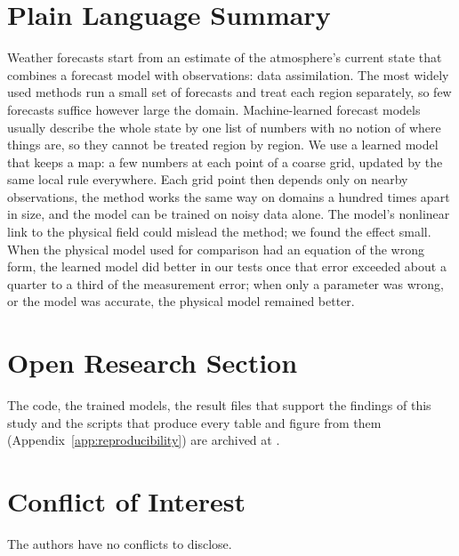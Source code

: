 \documentclass[draft]{PJ2019}
\begin{document}
\section*{Plain Language Summary}
Weather forecasts start from an estimate of the atmosphere's current state that combines a
forecast model with observations: data assimilation. The most widely used methods run
a small set of forecasts and treat each region separately, so few forecasts suffice however
large the domain. Machine-learned forecast models usually describe the
whole state by one list of numbers with no notion of where things are, so they cannot be
treated region by region. We use a learned model that keeps a map: a few numbers
at each point of a coarse grid, updated by the same local rule everywhere. Each grid point then
depends only on nearby observations, the method works the same way on domains a hundred times
apart in size, and the model can be trained on noisy data alone. The model's nonlinear
link to the physical field could mislead the method; we found the effect small. When the
physical model used for comparison had an equation of the wrong form, the learned model did better
in our tests once that error exceeded about a quarter to a third of the measurement error; when only
a parameter was wrong, or the model was accurate, the physical model remained better.














\appendix






\section*{Open Research Section}
The code, the trained models, the result files that support the findings of this study and the
scripts that produce every table and figure from them (Appendix~\ref{app:reproducibility}) are
archived at .

\acknowledgments

\section*{Conflict of Interest}
The authors have no conflicts to disclose.


\end{document}

